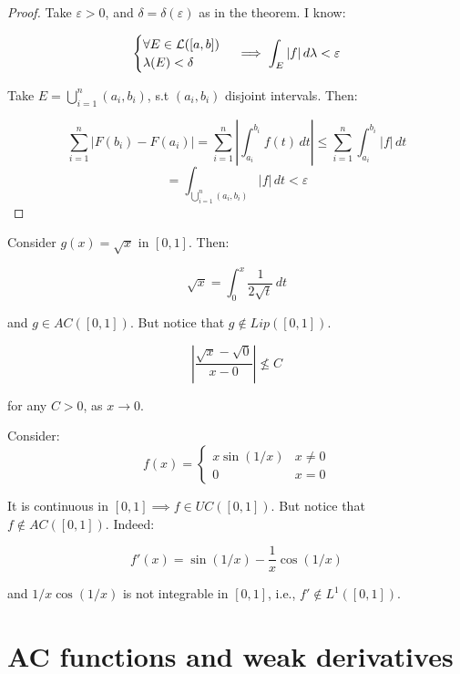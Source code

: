 \begin{proof}
    Take $\varepsilon > 0$, and $\delta = \delta(\varepsilon)$ as in the theorem.
    I know:

    $$\begin{cases}
        \forall E \in \mathcal{L}([a, b])\\
        \lambda(E) < \delta
    \end{cases} \implies \int_E |f| \, d\lambda < \varepsilon$$

    Take $E = \bigcup_{i=1}^n (a_i, b_i)$, s.t $(a_i, b_i)$ disjoint intervals.
    Then:

    $$\sum_{i=1}^n |F(b_i) - F(a_i)| = \sum_{i=1}^n \left| \int_{a_i}^{b_i} f(t) \, dt \right| \leq \sum_{i=1}^n \int_{a_i}^{b_i} |f| \, dt$$
    $$= \int_{\bigcup_{i=1}^n (a_i, b_i)} |f| \, dt < \varepsilon$$

\end{proof}

\begin{fexample}
    Consider $g(x) = \sqrt{x}$ in $[0, 1]$. Then:

    $$\sqrt{x} = \int_0^x \frac{1}{2\sqrt{t}} \, dt$$

    and $g \in AC([0, 1])$. But notice that $g \notin Lip([0, 1])$.

    $$\left| \frac{\sqrt{x} - \sqrt{0}}{x - 0} \right| \nleq C$$

    for any $C > 0$, as $x \to 0$.
\end{fexample}

\begin{fexample}[(UC $\nRightarrow$ AC)]
    Consider:
    $$f(x) = \begin{cases}
        x \sin(1/x) & x \neq 0\\
        0 & x = 0
    \end{cases}$$

    It is continuous in $[0, 1] \implies f \in UC([0, 1])$. But notice that
    $f \notin AC([0, 1])$. Indeed:

    $$f'(x) = \sin(1/x) - \frac{1}{x} \cos(1/x)$$

    and $1/x \cos(1/x)$ is not integrable in $[0, 1]$, i.e., $f' \notin L^1([0, 1])$.
\end{fexample}

\section{AC functions and weak derivatives}

